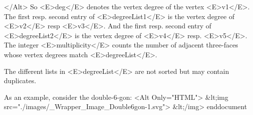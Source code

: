 \documentclass{standalone}
\begin{document}
     	 
 	</Alt>
 	So <E>deg</E> denotes the vertex degree of the vertex <E>v1</E>. The
 	first resp. second entry of <E>degreeList1</E> is the vertex degree of
 	<E>v2</E> resp <E>v3</E>. And the first resp. second
 	entry of <E>degreeList2</E> is the vertex degree of <E>v4</E> resp.
 	<E>v5</E>. The integer <E>multiplicity</E> counts the number of adjacent
 	three-faces whose vertex degrees match <E>degreeList</E>.

 	The different lists in <E>degreeList</E> are not sorted but may
 	contain duplicates.

	 As an example, consider the double-6-gon:
  <Alt Only="HTML">
 &lt;img src="./images/_Wrapper_Image_Double6gon-1.svg"> &lt;/img>
end{document}
\end{document}
